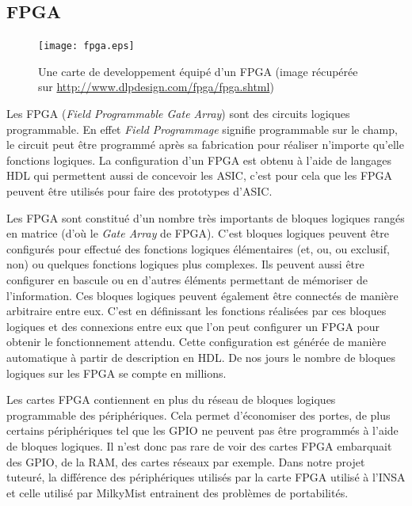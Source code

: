 \subsection{FPGA}

\begin{figure}[h!]
\begin{center}
\texttt{[image: fpga.eps]}
\end{center}
\caption{Une carte de developpement équipé d'un FPGA (image récupérée sur \url{http://www.dlpdesign.com/fpga/fpga.shtml})}
\end{figure}

Les FPGA (\textit{Field Programmable Gate Array}) sont des circuits logiques
programmable. En effet \textit{Field Programmage} signifie programmable sur le champ,
le circuit peut être programmé après sa fabrication pour réaliser n'importe qu'elle
fonctions logiques. La configuration d'un FPGA est obtenu à l'aide de langages HDL
qui permettent aussi de concevoir les ASIC, c'est pour cela que les FPGA peuvent être
utilisés pour faire des prototypes d'ASIC.

Les FPGA sont constitué d'un nombre très importants de bloques logiques rangés en
matrice (d'où le \textit{Gate Array} de FPGA). C'est bloques logiques peuvent être
configurés pour effectué des fonctions logiques élémentaires (et, ou, ou exclusif,
non) ou quelques fonctions logiques plus complexes. Ils peuvent aussi être configurer
en bascule ou en d'autres éléments permettant de mémoriser de l'information. Ces
bloques logiques peuvent également être connectés de manière arbitraire entre eux.
C'est en définissant les fonctions réalisées par ces bloques logiques et des
connexions entre eux que l'on peut configurer un FPGA pour obtenir le fonctionnement
attendu. Cette configuration est générée de manière automatique à partir de
description en HDL. De nos jours le nombre de bloques logiques sur les FPGA se compte
en millions. 

Les cartes FPGA contiennent en plus du réseau de bloques logiques programmable des
périphériques. Cela permet d'économiser des portes, de plus certains périphériques
tel que les GPIO ne peuvent pas être programmés à l'aide de bloques logiques. Il
n'est donc pas rare de voir des cartes FPGA embarquait des GPIO, de la RAM, des
cartes réseaux par exemple. Dans notre projet tuteuré, la différence des
périphériques utilisés par la carte FPGA utilisé à l'INSA et celle utilisé par
MilkyMist entrainent des problèmes de portabilités.

